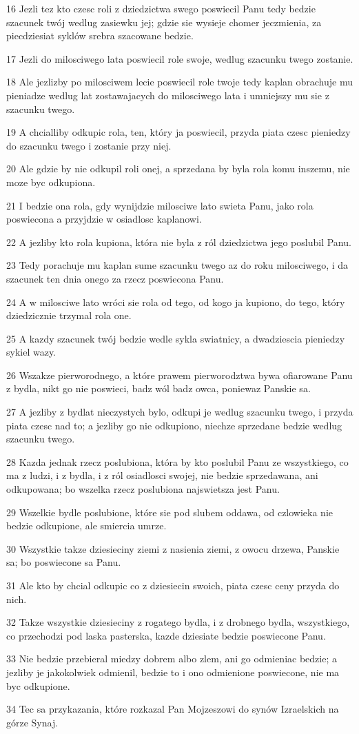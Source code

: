 \par 16 Jezli tez kto czesc roli z dziedzictwa swego poswiecil Panu tedy bedzie szacunek twój wedlug zasiewku jej; gdzie sie wysieje chomer jeczmienia, za piecdziesiat syklów srebra szacowane bedzie.
\par 17 Jezli do milosciwego lata poswiecil role swoje, wedlug szacunku twego zostanie.
\par 18 Ale jezlizby po milosciwem lecie poswiecil role twoje tedy kaplan obrachuje mu pieniadze wedlug lat zostawajacych do milosciwego lata i umniejszy mu sie z szacunku twego.
\par 19 A chcialliby odkupic rola, ten, który ja poswiecil, przyda piata czesc pieniedzy do szacunku twego i zostanie przy niej.
\par 20 Ale gdzie by nie odkupil roli onej, a sprzedana by byla rola komu inszemu, nie moze byc odkupiona.
\par 21 I bedzie ona rola, gdy wynijdzie milosciwe lato swieta Panu, jako rola poswiecona a przyjdzie w osiadlosc kaplanowi.
\par 22 A jezliby kto rola kupiona, która nie byla z ról dziedzictwa jego poslubil Panu.
\par 23 Tedy porachuje mu kaplan sume szacunku twego az do roku milosciwego, i da szacunek ten dnia onego za rzecz poswiecona Panu.
\par 24 A w milosciwe lato wróci sie rola od tego, od kogo ja kupiono, do tego, który dziedzicznie trzymal rola one.
\par 25 A kazdy szacunek twój bedzie wedle sykla swiatnicy, a dwadziescia pieniedzy sykiel wazy.
\par 26 Wszakze pierworodnego, a które prawem pierworodztwa bywa ofiarowane Panu z bydla, nikt go nie poswieci, badz wól badz owca, poniewaz Panskie sa.
\par 27 A jezliby z bydlat nieczystych bylo, odkupi je wedlug szacunku twego, i przyda piata czesc nad to; a jezliby go nie odkupiono, niechze sprzedane bedzie wedlug szacunku twego.
\par 28 Kazda jednak rzecz poslubiona, która by kto poslubil Panu ze wszystkiego, co ma z ludzi, i z bydla, i z ról osiadlosci swojej, nie bedzie sprzedawana, ani odkupowana; bo wszelka rzecz poslubiona najswietsza jest Panu.
\par 29 Wszelkie bydle poslubione, które sie pod slubem oddawa, od czlowieka nie bedzie odkupione, ale smiercia umrze.
\par 30 Wszystkie takze dziesieciny ziemi z nasienia ziemi, z owocu drzewa, Panskie sa; bo poswiecone sa Panu.
\par 31 Ale kto by chcial odkupic co z dziesiecin swoich, piata czesc ceny przyda do nich.
\par 32 Takze wszystkie dziesieciny z rogatego bydla, i z drobnego bydla, wszystkiego, co przechodzi pod laska pasterska, kazde dziesiate bedzie poswiecone Panu.
\par 33 Nie bedzie przebieral miedzy dobrem albo zlem, ani go odmieniac bedzie; a jezliby je jakokolwiek odmienil, bedzie to i ono odmienione poswiecone, nie ma byc odkupione.
\par 34 Tec sa przykazania, które rozkazal Pan Mojzeszowi do synów Izraelskich na górze Synaj.


